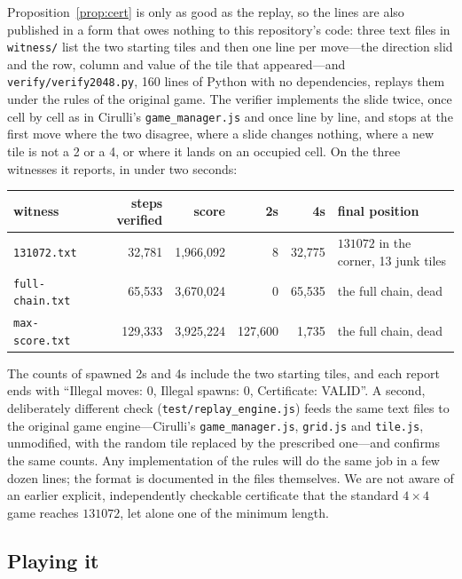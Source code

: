 \documentclass[11pt]{article}
\theoremstyle{definition}
\theoremstyle{remark}
\begin{document}
Proposition~\ref{prop:cert} is only as good as the replay, so the lines
are also published in a form that owes nothing to this repository's code:
three text files in \texttt{witness/} list the two starting tiles and
then one line per move---the direction slid and the row, column and value
of the tile that appeared---and \texttt{verify/verify2048.py}, 160 lines
of Python with no dependencies, replays them under the rules of the
original game. The verifier implements the slide twice, once cell by cell
as in Cirulli's \texttt{game\_manager.js} and once line by line, and stops
at the first move where the two disagree, where a slide changes nothing,
where a new tile is not a 2 or a 4, or where it lands on an occupied cell.
On the three witnesses it reports, in under two seconds:
\begin{center}\footnotesize
\begin{tabular}{@{}lrrrrl@{}}
\toprule
witness & steps verified & score & 2s & 4s & final position \\
\midrule
\texttt{131072.txt} & 32{,}781 & 1{,}966{,}092 & 8 & 32{,}775 & $131072$ in the corner, 13 junk tiles \\
\texttt{full-chain.txt} & 65{,}533 & 3{,}670{,}024 & 0 & 65{,}535 & the full chain, dead \\
\texttt{max-score.txt} & 129{,}333 & 3{,}925{,}224 & 127{,}600 & 1{,}735 & the full chain, dead \\
\bottomrule
\end{tabular}
\end{center}
The counts of spawned 2s and 4s include the two starting tiles, and each
report ends with ``Illegal moves: 0, Illegal spawns: 0, Certificate:
VALID''. A second, deliberately different check
(\texttt{test/replay\_engine.js}) feeds the same text files to the
original game engine---Cirulli's \texttt{game\_manager.js},
\texttt{grid.js} and \texttt{tile.js}, unmodified, with the random tile
replaced by the prescribed one---and confirms the same counts. Any
implementation of the rules will do the same job in a few dozen lines;
the format is documented in the files themselves. We are not aware of an
earlier explicit, independently checkable certificate that the standard
$4\times4$ game reaches $131072$, let alone one of the minimum length.



\subsection{Playing it}
\end{document}
